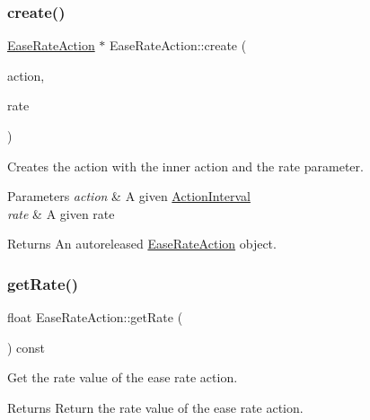 \subsubsection{\texorpdfstring{create()}{create()}}
{\footnotesize\ttfamily \hyperlink{classEaseRateAction}{Ease\+Rate\+Action} $\ast$ Ease\+Rate\+Action\+::create (\begin{DoxyParamCaption}\item[{\hyperlink{classActionInterval}{Action\+Interval} $\ast$}]{action,  }\item[{float}]{rate }\end{DoxyParamCaption})\hspace{0.3cm}{\ttfamily [static]}}



Creates the action with the inner action and the rate parameter. 


\begin{DoxyParams}{Parameters}
{\em action} & A given \hyperlink{classActionInterval}{Action\+Interval} \\
\hline
{\em rate} & A given rate \\
\hline
\end{DoxyParams}
\begin{DoxyReturn}{Returns}
An autoreleased \hyperlink{classEaseRateAction}{Ease\+Rate\+Action} object. 
\end{DoxyReturn}
\mbox{\label{classEaseRateAction_ab1499ad93170ecc10b44ad02888c889d}} 
\subsubsection{\texorpdfstring{get\+Rate()}{getRate()}\hspace{0.1cm}{\footnotesize\ttfamily [1/2]}}
{\footnotesize\ttfamily float Ease\+Rate\+Action\+::get\+Rate (\begin{DoxyParamCaption}{ }\end{DoxyParamCaption}) const\hspace{0.3cm}{\ttfamily [inline]}}



Get the rate value of the ease rate action. 

\begin{DoxyReturn}{Returns}
Return the rate value of the ease rate action. 
\end{DoxyReturn}
\mbox{\label{classEaseRateAction_ab1499ad93170ecc10b44ad02888c889d}} 
